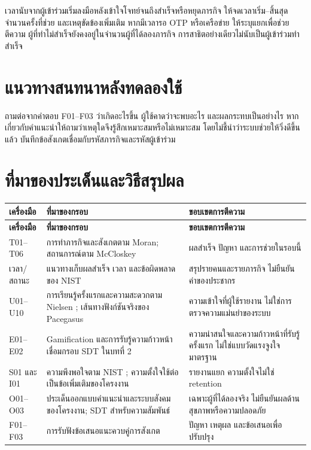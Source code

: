 เวลานับจากผู้เข้าร่วมเริ่มลงมือหลังเข้าใจโจทย์จนถึงสำเร็จหรือหยุดภารกิจ ให้จดเวลาเริ่ม--สิ้นสุด จำนวนครั้งที่ช่วย และเหตุขัดข้องเพิ่มเติม หากมีเวลารอ OTP หรือเครือข่าย ให้ระบุแยกเพื่อช่วยตีความ ผู้ที่ทำไม่สำเร็จยังคงอยู่ในจำนวนผู้ที่ได้ลองภารกิจ การสาธิตอย่างเดียวไม่นับเป็นผู้เข้าร่วมทำสำเร็จ

\section*{แนวทางสนทนาหลังทดลองใช้}

ถามต่อจากคำตอบ F01--F03 ว่าเกิดอะไรขึ้น ผู้ใช้คาดว่าจะพบอะไร และผลกระทบเป็นอย่างไร หากเกี่ยวกับคำแนะนำให้ถามว่าเหตุใดจึงรู้สึกเหมาะสมหรือไม่เหมาะสม โดยไม่ชี้นำว่าระบบช่วยให้วิ่งดีขึ้นแล้ว บันทึกข้อสังเกตเชื่อมกับรหัสภารกิจและรหัสผู้เข้าร่วม

\clearpage
\section*{ที่มาของประเด็นและวิธีสรุปผล}

\begingroup
\small
\renewcommand{\arraystretch}{1.15}
\begin{longtable}{|>{\raggedright\arraybackslash}p{}|>{\raggedright\arraybackslash}p{}|>{\raggedright\arraybackslash}p{}|}
\hline
\textbf{เครื่องมือ} & \textbf{ที่มาของกรอบ} & \textbf{ขอบเขตการตีความ} \\ \hline
\endfirsthead
\hline \textbf{เครื่องมือ} & \textbf{ที่มาของกรอบ} & \textbf{ขอบเขตการตีความ} \\ \hline
\endhead
T01--T06 & การทำภารกิจและสังเกตตาม Moran; สถานการณ์ตาม McCloskey \cite{moran2019usability,mccloskey2014tasks} & ผลสำเร็จ ปัญหา และการช่วยในรอบนี้ \\ \hline
เวลา/สถานะ & แนวทางเก็บผลสำเร็จ เวลา และข้อผิดพลาดของ NIST \cite{nistUsabilityTesting} & สรุปรายคนและรายภารกิจ ไม่ยืนยันค่าของประชากร \\ \hline
U01--U10 & การเรียนรู้ครั้งแรกและความสะดวกตาม Nielsen \cite{nielsen2012usability}; เส้นทางฟังก์ชันจริงของ Pacegasus & ความเข้าใจที่ผู้ใช้รายงาน ไม่ใช่การตรวจความแม่นยำของระบบ \\ \hline
E01--E02 & Gamification และการรับรู้ความก้าวหน้า เชื่อมกรอบ SDT ในบทที่ 2 \cite{ryan2020} & ความน่าสนใจและความก้าวหน้าที่รับรู้ครั้งแรก ไม่ใช่แบบวัดแรงจูงใจมาตรฐาน \\ \hline
S01 และ I01 & ความพึงพอใจตาม NIST \cite{nistUsabilityTesting}; ความตั้งใจใช้ต่อเป็นข้อเพิ่มเติมของโครงงาน & รายงานแยก ความตั้งใจไม่ใช่ retention \\ \hline
O01--O03 & ประเด็นออกแบบคำแนะนำและระบบสังคมของโครงงาน; SDT สำหรับความสัมพันธ์ \cite{ryan2020} & เฉพาะผู้ที่ได้ลองจริง ไม่ยืนยันผลด้านสุขภาพหรือความปลอดภัย \\ \hline
F01--F03 & การรับฟังข้อเสนอแนะควบคู่การสังเกต \cite{moran2019usability} & ปัญหา เหตุผล และข้อเสนอเพื่อปรับปรุง \\ \hline
\end{longtable}
\endgroup

